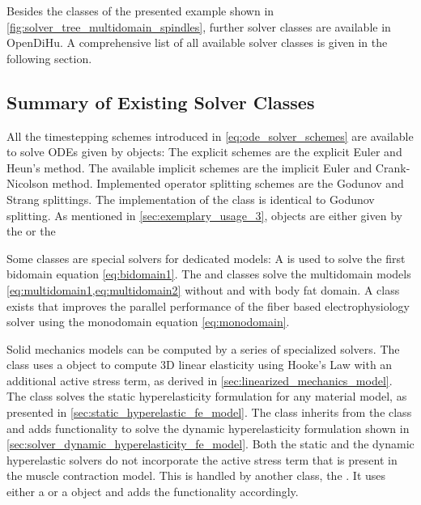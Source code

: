 Besides the classes of the presented example shown in \cref{fig:solver_tree_multidomain_spindles}, further solver classes are available in OpenDiHu. A comprehensive list of all available solver classes is given in the following section.

\subsection{Summary of Existing Solver Classes}\label{sec:summary_of_existing_solver_classes}

All the timestepping schemes introduced in \cref{eq:ode_solver_schemes} are available to solve ODEs given by  objects:
The explicit schemes are the explicit Euler and Heun's method. The available implicit schemes are the implicit Euler and Crank-Nicolson method.
Implemented operator splitting schemes are the Godunov and Strang splittings. The implementation of the  class is identical to Godunov splitting.
As mentioned in \cref{sec:exemplary_usage_3},  objects are either given by the  or the 

Some classes are special solvers for dedicated models: A  is used to solve the first bidomain equation \cref{eq:bidomain1}. The  and  classes solve the multidomain models \cref{eq:multidomain1,eq:multidomain2} without and with body fat domain. A class  exists that improves the parallel performance of the fiber based electrophysiology solver using the monodomain equation \cref{eq:monodomain}.

Solid mechanics models can be computed by a series of specialized solvers. The  class uses a  object to compute 3D linear elasticity using Hooke's Law with an additional active stress term, as derived in \cref{sec:linearized_mechanics_model}. The  class solves the static hyperelasticity formulation for any material model, as presented in \cref{sec:static_hyperelastic_fe_model}. The  class inherits from the  class and adds functionality to solve the dynamic hyperelasticity formulation shown in \cref{sec:solver_dynamic_hyperelasticity_fe_model}. 
Both the static and the dynamic hyperelastic solvers do not incorporate the active stress term that is present in the muscle contraction model. This is handled by another class, the . It uses either a  or a  object and adds the functionality accordingly.


